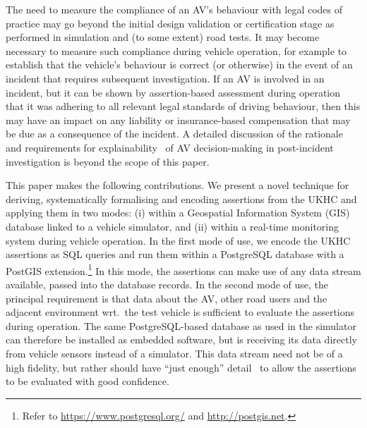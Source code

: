 The need to measure the compliance of an AV's behaviour with legal codes of practice may go beyond the initial design validation or certification stage as performed in simulation and (to some extent) road tests. It may become necessary to measure such compliance during vehicle operation, for example to establish that the vehicle's behaviour is correct (or otherwise) in the event of an incident that requires subsequent investigation. If an AV is involved in an incident, but it can be shown by assertion-based assessment during operation that it was adhering to all relevant legal standards of driving behaviour, then this may have an impact on any liability or insurance-based compensation that may be due as a consequence of the incident. A detailed discussion of the rationale and requirements for explainability~\cite{rosenfeld2019explainability} of AV decision-making in post-incident investigation is beyond the scope of this paper.



This paper makes the following contributions. We present a novel technique for deriving, systematically formalising and encoding assertions from the UKHC and applying them in two modes: (i) within a Geospatial Information System (GIS) database linked to a vehicle simulator, and (ii) within a real-time monitoring system during vehicle operation.
%
In the first mode of use, we encode the UKHC assertions as SQL queries and run them within a PostgreSQL database with a PostGIS extension.\footnote{Refer to \url{https://www.postgresql.org/} and \url{http://postgis.net}.} In this mode, the assertions can make use of any data stream available, passed into the database records.
%
In the second mode of use, the principal requirement is that data about the AV, other road users and the adjacent environment wrt.\ the test vehicle is sufficient to evaluate the assertions during operation. The same PostgreSQL-based database as used in the simulator can therefore be installed as embedded software, but is receiving its data directly from vehicle sensors instead of a simulator. This data stream need not be of a high fidelity, but rather should have ``just enough'' detail~\cite{Koopman2018} to allow the assertions to be evaluated with good confidence.





